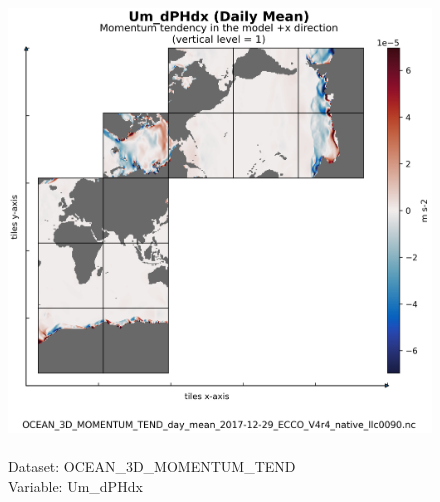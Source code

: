 \begin{figure}[H]
\centering
\includegraphics[scale=0.5]{../images/plots/native_plots/Ocean_Three-Dimensional_Momentum_Tendency/Um_dPHdx.png}
\caption{\\Dataset: OCEAN\_3D\_MOMENTUM\_TEND\\Variable: Um\_dPHdx}
\label{tab:table-OCEAN_3D_MOMENTUM_TEND_Um_dPHdx-Plot}
\end{figure}
\pagebreak
